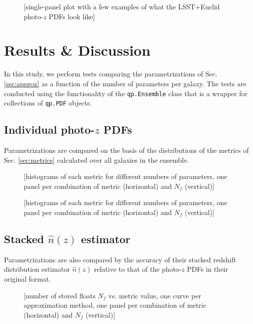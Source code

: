 \documentclass[\docopts]{\docclass}
\newcommand{\pz}{photo-$z$ PDF}
\begin{document}
\begin{figure}
  \caption{[single-panel plot with a few examples of what the LSST+Euclid \pz s 
look like]
  \label{fig:mg}}
\end{figure}


\section{Results \& Discussion}
\label{sec:results}


In this study, we perform tests comparing the parametrizations of Sec. 
\ref{sec:approx} as a function of the number of parameters per galaxy.  The 
tests are conducted using the functionality of the \texttt{qp.Ensemble} class 
that is a wrapper for collections of \texttt{qp.PDF} objects.

\subsection{Individual \pz s}
\label{sec:individual}

Parametrizations are compared on the basis of the distributions of the metrics 
of Sec. \ref{sec:metrics} calculated over all galaxies in the ensemble.  

\begin{figure}
  \caption{[histograms of each metric for different numbers of parameters, one 
panel per combination of metric (horizontal) and $N_{f}$ (vertical)]
  \label{fig:individual-ss}}
\end{figure}

\begin{figure}
  \caption{[histograms of each metric for different numbers of parameters, one 
panel per combination of metric (horizontal) and $N_{f}$ (vertical)]
  \label{fig:individual-mg}}
\end{figure}

\subsection{Stacked $\hat{n}(z)$ estimator}
\label{sec:stacked}

Parametrizations are also compared by the accuracy of their stacked redshift 
distribution estimator $\hat{n}(z)$ relative to that of the \pz s in their 
original format.  

\begin{figure}
  \caption{[number of stored floats $N_{f}$ vs. metric value, one curve per 
approximation method, one panel per combination of metric (horizontal) and 
$N_{f}$ (vertical)]
  \label{fig:stacked-ss}}
\end{figure}
\end{document}
